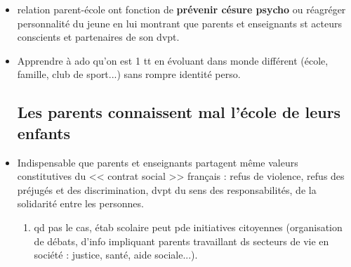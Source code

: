 \documentclass[12pt]{report}
\begin{document}
\begin{itemize}
\item relation parent-école ont fonction de \textbf{prévenir césure psycho} ou réagréger personnalité du jeune en lui montrant que parents et enseignants st acteurs conscients et partenaires de son dvpt.\\

\item Apprendre à ado qu'on est 1 tt en évoluant dans monde différent (école, famille, club de sport...) sans rompre identité perso. \\


\vspace{0.5cm}

\subsection{Les parents connaissent mal l'école de leurs enfants}


\item Indispensable que parents et enseignants partagent même valeurs constitutives du << contrat social >> français : refus de violence, refus des préjugés et des discrimination, dvpt du sens des responsabilités, de la solidarité entre les personnes. \\
\begin{enumerate}
\item qd pas le cas, étab scolaire peut pde initiatives citoyennes (organisation de débats, d'info impliquant parents travaillant ds secteurs de vie en société : justice, santé, aide sociale...).
\end{enumerate}


\end{itemize}
\end{document}
